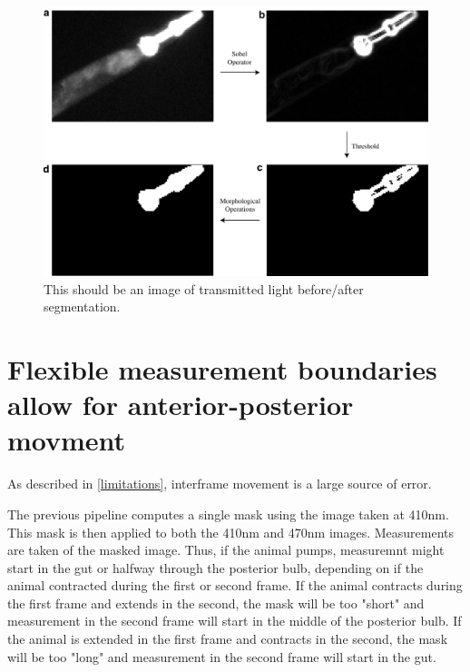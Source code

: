 \begin{figure}[ht]
    \centering
    \includegraphics[scale=.40]{Figures/rendered_files/sobel}
    \decoRule
    \caption[Overview of the improved segmentation algorithm]{This should be an image of transmitted light before/after segmentation.}
    \label{fig:TLSeg}
\end{figure}

\section{Flexible measurement boundaries allow for anterior-posterior movment} \label{channelSegmentation}

As described in \ref{limitations}, interframe movement is a large source of error.


The previous pipeline computes a single mask using the image taken at 410nm. This mask is then applied to both the 410nm and 470nm images. Measurements are taken of the masked image. Thus, if the animal pumps, measuremnt might start in the gut or halfway through the posterior bulb, depending on if the animal contracted during the first or second frame. If the animal contracts during the first frame and extends in the second, the mask will be too "short" and measurement in the second frame will start in the middle of the posterior bulb. If the animal is extended in the first frame and contracts in the second, the mask will be too "long" and measurement in the second frame will start in the gut.


